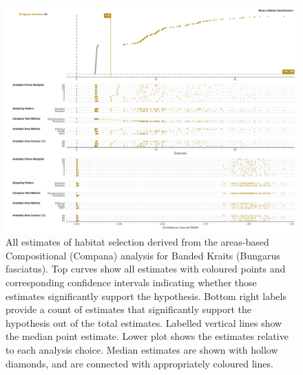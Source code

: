 \documentclass[10pt,a4paper]{article}
\begin{document}
\begin{figure}
\includegraphics[width=1\linewidth]{../../figures/specCurve_Bungarus fasciatus_area} \caption{All estimates of habitat selection derived from the areas-based Compositional (Compana) analysis for Banded Kraits (Bungarus fasciatus). Top curves show all estimates with coloured points and corresponding confidence intervals indicating whether those estimates significantly support the hypothesis. Bottom right labels provide a count of estimates that significantly support the hypothesis out of the total estimates. Labelled vertical lines show the median point estimate. Lower plot shows the estimates relative to each analysis choice. Median estimates are shown with hollow diamonds, and are connected with appropriately coloured lines.}\label{fig:specCurveAreaBUFA}
\end{figure}
\end{document}
